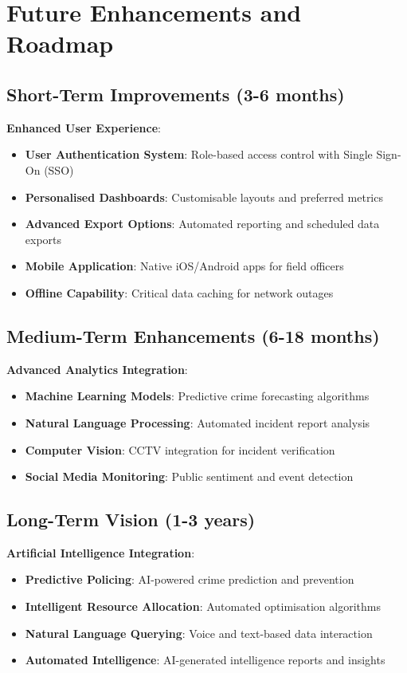 \documentclass[12pt,a4paper]{article}
\begin{document}
\section{Future Enhancements and Roadmap}

\subsection{Short-Term Improvements (3-6 months)}

\textbf{Enhanced User Experience}:
\begin{itemize}
    \item \textbf{User Authentication System}: Role-based access control with Single Sign-On (SSO)
    \item \textbf{Personalised Dashboards}: Customisable layouts and preferred metrics
    \item \textbf{Advanced Export Options}: Automated reporting and scheduled data exports
    \item \textbf{Mobile Application}: Native iOS/Android apps for field officers
    \item \textbf{Offline Capability}: Critical data caching for network outages
\end{itemize}

\subsection{Medium-Term Enhancements (6-18 months)}

\textbf{Advanced Analytics Integration}:
\begin{itemize}
    \item \textbf{Machine Learning Models}: Predictive crime forecasting algorithms
    \item \textbf{Natural Language Processing}: Automated incident report analysis
    \item \textbf{Computer Vision}: CCTV integration for incident verification
    \item \textbf{Social Media Monitoring}: Public sentiment and event detection
\end{itemize}

\subsection{Long-Term Vision (1-3 years)}

\textbf{Artificial Intelligence Integration}:
\begin{itemize}
    \item \textbf{Predictive Policing}: AI-powered crime prediction and prevention
    \item \textbf{Intelligent Resource Allocation}: Automated optimisation algorithms
    \item \textbf{Natural Language Querying}: Voice and text-based data interaction
    \item \textbf{Automated Intelligence}: AI-generated intelligence reports and insights
\end{itemize}
\end{document}
